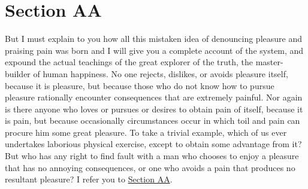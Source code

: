\hypertarget{x-section-aa}{\section*{Section AA}}
But I must explain to you how all this mistaken
idea of denouncing pleasure and praising pain
was born and I will give you a complete account
of the system, and expound the actual teachings
of the great explorer of the truth, the
master-builder of human happiness. No one
rejects, dislikes, or avoids pleasure itself,
because it is pleasure, but because those who
do not know how to pursue pleasure rationally
encounter consequences that are extremely
painful. Nor again is there anyone who loves
or pursues or desires to obtain pain of itself,
because it is pain, but because occasionally
circumstances occur in which toil and pain can
procure him some great pleasure. To take a trivial
example, which of us ever undertakes laborious
physical exercise, except to obtain some
advantage from it? But who has any right
to find fault with a man who chooses to
enjoy a pleasure that has no
annoying consequences, or one who avoids
a pain that produces no resultant pleasure?
I refer you to \hyperlink{x-section-aa}{Section AA}.
